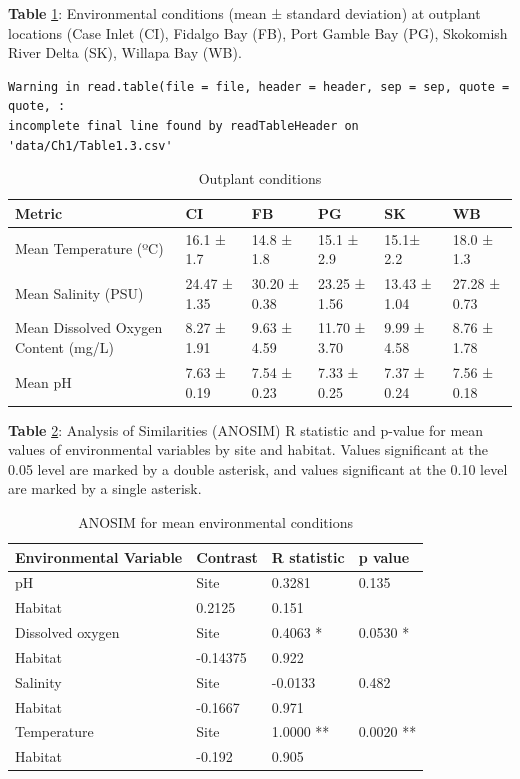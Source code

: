 \documentclass [11pt, proquest] {uwthesis}[2015/03/03]
\begin{document}
\textbf{Table} \ref{tab:outplantenv}: Environmental conditions (mean ± standard deviation) at outplant locations (Case Inlet (CI), Fidalgo Bay (FB), Port Gamble Bay (PG), Skokomish River Delta (SK), Willapa Bay (WB).
\begin{verbatim}
Warning in read.table(file = file, header = header, sep = sep, quote = quote, :
incomplete final line found by readTableHeader on 'data/Ch1/Table1.3.csv'
\end{verbatim}
\begingroup\fontsize{8}{10}\selectfont
\begin{longtable}[t]{llllll}
\caption{\label{tab:outplantenv}Outplant conditions}\\
\toprule
Metric & CI & FB & PG & SK & WB\\
\midrule
Mean Temperature (ºC) & 16.1 ± 1.7 & 14.8 ± 1.8 & 15.1 ± 2.9 & 15.1± 2.2 & 18.0 ± 1.3\\
Mean Salinity (PSU) & 24.47 ± 1.35 & 30.20 ± 0.38 & 23.25 ± 1.56 & 13.43 ± 1.04 & 27.28 ± 0.73\\
Mean Dissolved Oxygen Content (mg/L) & 8.27 ± 1.91 & 9.63 ± 4.59 & 11.70 ± 3.70 & 9.99 ± 4.58 & 8.76 ± 1.78\\
Mean pH & 7.63 ± 0.19 & 7.54 ± 0.23 & 7.33 ± 0.25 & 7.37 ± 0.24 & 7.56 ± 0.18\\
\bottomrule
\end{longtable}
\endgroup{}
\clearpage

\textbf{Table} \ref{tab:envmeans}: Analysis of Similarities (ANOSIM) R statistic and p-value for mean values of environmental variables by site and habitat. Values significant at the 0.05 level are marked by a double asterisk, and values significant at the 0.10 level are marked by a single asterisk.

\begingroup\fontsize{8}{10}\selectfont
\begin{longtable}[t]{llll}
\caption{\label{tab:envmeans}ANOSIM for mean environmental conditions}\\
\toprule
Environmental Variable & Contrast & R statistic & p value\\
\midrule
pH & Site & 0.3281 & 0.135\\
Habitat & 0.2125 & 0.151 & \\
Dissolved oxygen & Site & 0.4063 * & 0.0530 *\\
Habitat & -0.14375 & 0.922 & \\
Salinity & Site & -0.0133 & 0.482\\
\addlinespace
Habitat & -0.1667 & 0.971 & \\
Temperature & Site & 1.0000 ** & 0.0020 **\\
Habitat & -0.192 & 0.905 & \\
\bottomrule
\end{longtable}
\endgroup{}
\clearpage
\end{document}
